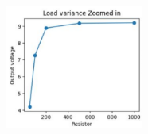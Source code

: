 \documentclass[12pt, a4paper]{article}
\begin{document}
\begin{figure}[h!]
\centering
    \includegraphics[width=0.4\textwidth]{Load Variance Zoomed.png}
\end{figure}
\end{document}
